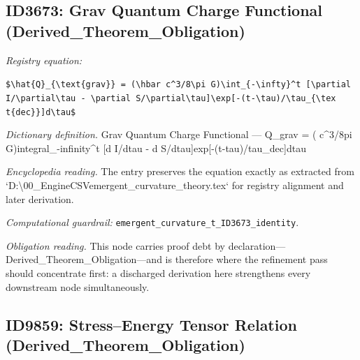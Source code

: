 \documentclass[11pt]{article}
\theoremstyle{remark}
\begin{document}
\subsection{ID3673: Grav Quantum Charge Functional (Derived\_Theorem\_Obligation)}

\noindent\textit{Registry equation:}\par
{\small\texttt{\$\textbackslash{}hat\{Q\}\_\{\textbackslash{}text\{grav\}\} = (\textbackslash{}hbar c\textasciicircum{}3/8\textbackslash{}pi G)\textbackslash{}int\_\{-\textbackslash{}infty\}\textasciicircum{}t [\textbackslash{}partial I/\textbackslash{}partial\textbackslash{}tau - \textbackslash{}partial S/\textbackslash{}partial\textbackslash{}tau]\textbackslash{}exp[-(t-\textbackslash{}tau)/\textbackslash{}tau\_\{\textbackslash{}tex t\{dec\}\}]d\textbackslash{}tau\$}}\par\medskip
\noindent\textit{Dictionary definition.} Grav Quantum Charge Functional --- Q\_grav = ( c\textasciicircum{}3/8pi G)integral\_-infinity\textasciicircum{}t [d I/dtau - d S/dtau]exp[-(t-tau)/tau\_dec]dtau\par\medskip
\noindent\textit{Encyclopedia reading.} The entry preserves the equation exactly as extracted from `D:\textbackslash{}00\_EngineCSVemergent\_curvature\_theory.tex` for registry alignment and later derivation.
\par\medskip\noindent\textit{Computational guardrail:} \texttt{emergent\_curvature\_t\_ID3673\_identity}.
\par\medskip\noindent\textit{Obligation reading.} This node carries proof debt by declaration---Derived\_Theorem\_Obligation---and is therefore where the refinement pass should concentrate first: a discharged derivation here strengthens every downstream node simultaneously.

\subsection{ID9859: Stress--Energy Tensor Relation (Derived\_Theorem\_Obligation)}
\end{document}
